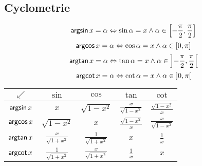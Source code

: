  \subsection{Cyclometrie}
 \label{sec:cyclo}
 \[
	   \mbox{\textsf{argsin}}\, x = \alpha \Leftrightarrow \sin \alpha = x \wedge \alpha \in \left[ -\frac{\pi}{2},\frac{\pi}{2} \right]
  \]
  \[
	   \mbox{\textsf{argcos}}\, x = \alpha \Leftrightarrow \cos \alpha = x \wedge \alpha \in \left[ 0,\pi \right]
  \]
  \[
	   \mbox{\textsf{argtan}}\, x = \alpha \Leftrightarrow \tan \alpha = x \wedge \alpha \in \left] -\frac{\pi}{2},\frac{\pi}{2} \right[
  \]
  \[
	   \mbox{\textsf{argcot}}\, x = \alpha \Leftrightarrow \cot \alpha = x \wedge \alpha \in \left] 0,\pi \right[
  \]
  \begin{center}
	\begin{tabular}{|c||c|c|c|c|}
	  \hline
	  $\swarrow$  & $\sin$ 										& $\cos$ 										& $\tan$ & $\cot$\\
	  \hline \hline
	  $\mbox{\textsf{argsin}}\, x$ & $x$ 											& $\sqrt{1-x^2}$ 						&	$\frac{x}{\sqrt{1-x^2}}$ & $\frac{\sqrt{1-x^2}}{x}$ \\
	  \hline
	  $\mbox{\textsf{argcos}}\, x$ & $\sqrt{1-x^2}$ 						& $x$ 											& $\frac{\sqrt{1-x^2}}{x}$ & $\frac{x}{\sqrt{1-x^2}}$ \\
	  \hline
	  $\mbox{\textsf{argtan}}\, x$ & $\frac{x}{\sqrt{1+x^2}}$ 	& $\frac{1}{\sqrt{1+x^2}}$ 	& $x$ & $\frac{1}{x}$ \\
	  \hline
	  $\mbox{\textsf{argcot}}\, x$ & $\frac{1}{\sqrt{1+x^2}}$ 	& $\frac{x}{\sqrt{1+x^2}}$ 	& $\frac{1}{x}$ & $x$ \\
	  \hline 
	\end{tabular}
\end{center}
